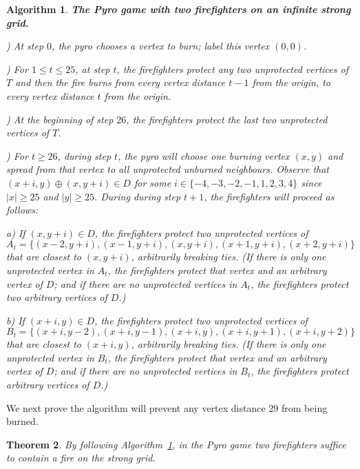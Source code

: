 \documentclass[12pt]{article}
\newtheorem{theorem}{Theorem}
\newtheorem{algorithm}[theorem]{Algorithm}
\begin{document}
\begin{algorithm}\label{alg:strong}{\bf The Pyro game with two firefighters on an infinite strong grid.}\medskip

) At step $0$, the pyro chooses a vertex to burn; label this vertex $(0,0)$.\medskip

) For $1 \leq t \leq 25$, at step $t$, the firefighters protect any two unprotected vertices of $T$ and then the fire burns from every vertex distance $t-1$ from the origin, to every vertex distance $t$ from the origin.\medskip

) At the beginning of step $26$, the firefighters protect the last two unprotected vertices of $T$.\medskip

) For $t \geq 26$, during step $t$, the pyro will choose one burning vertex $(x,y)$ and spread from that vertex to all unprotected unburned neighbours.  Observe that $(x+i,y) \oplus (x,y+i) \in D$ for some $i \in \{-4,-3,-2,-1,1,2,3,4\}$ since $|x| \geq 25$ and $|y| \geq 25$. During during step $t+1$, the firefighters will proceed as follows:\medskip

\hspace{0.45in}a) If $(x,y+i) \in D$, the firefighters protect two unprotected vertices of $$A_t = \{ (x-2,y+i),(x-1,y+i),(x,y+i),(x+1,y+i),(x+2,y+i)\}$$ that are closest to $(x,y+i)$, arbitrarily breaking ties.  (If there is only one unprotected vertex in $A_t$, the firefighters protect that vertex and an arbitrary vertex of $D$; and if there are no unprotected vertices in $A_t$, the firefighters protect two arbitrary vertices of $D$.)\medskip

\hspace{0.45in}b) If $(x+i,y) \in D$, the firefighters protect two unprotected vertices of $$B_t = \{ (x+i,y-2),(x+i,y-1),(x+i,y),(x+i,y+1),(x+i,y+2)\}$$ that are closest to $(x+i,y)$, arbitrarily breaking ties.  (If there is only one unprotected vertex in $B_t$, the firefighters protect that vertex and an arbitrary vertex of $D$; and if there are no unprotected vertices in $B_t$, the firefighters protect arbitrary vertices of $D$.)\end{algorithm}

We next prove the algorithm will prevent any vertex distance $29$ from being burned.

\begin{theorem}By following Algorithm~\ref{alg:strong}, in the Pyro game two firefighters suffice to contain a fire on the strong grid.\end{theorem}
\end{document}
